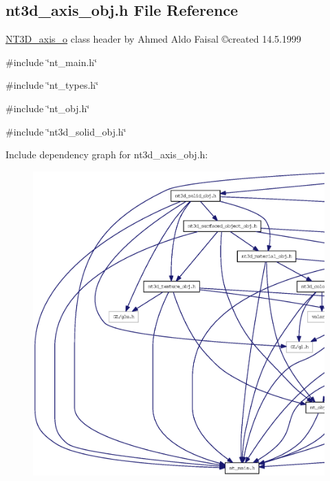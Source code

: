 \subsection{nt3d\_\-axis\_\-obj.h File Reference}
\label{nt3d__axis__obj_8h}



\begin{DoxyItemize}
\item \hyperlink{class_n_t3_d__axis__o}{NT3D\_\-axis\_\-o} class header by Ahmed Aldo Faisal \copyright created 14.5.1999 
\end{DoxyItemize} 


{\ttfamily \#include \char`\"{}nt\_\-main.h\char`\"{}}\par
{\ttfamily \#include \char`\"{}nt\_\-types.h\char`\"{}}\par
{\ttfamily \#include \char`\"{}nt\_\-obj.h\char`\"{}}\par
{\ttfamily \#include \char`\"{}nt3d\_\-solid\_\-obj.h\char`\"{}}\par
Include dependency graph for nt3d\_\-axis\_\-obj.h:
\nopagebreak
\begin{figure}[H]
\begin{center}
\leavevmode
\includegraphics[width=400pt]{nt3d__axis__obj_8h__incl}
\end{center}
\end{figure}
